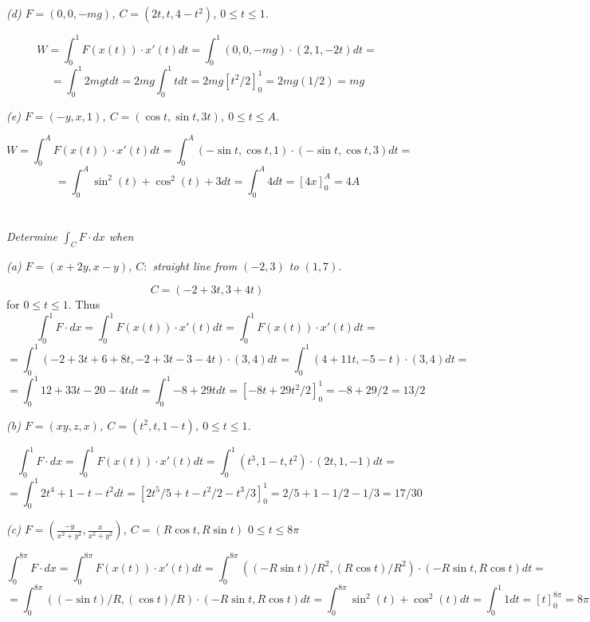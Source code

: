 \documentclass[11pt,oneside,titlepage]{book}
\begin{document}
\textit{(d) $F = (0, 0, -mg)$, $C = (2t, t, 4 - t^2)$, $0 \leq t \leq 1$.}

$$W = \int_0^1{F(x(t)) \cdot x'(t) dt} =
\int_0^1{(0, 0, -mg) \cdot (2, 1, -2t) dt} =$$
$$ =
\int_0^1{2mgt dt} = 2mg \int_0^1{t dt} = 2mg [t^2/2]_0^1 = 2mg(1/2) = mg$$

\textit{(e) $F = (-y, x, 1)$, $C = (\cos t, \sin t, 3 t)$, $0 \leq t \leq A$.}

$$W = \int_0^A{F(x(t)) \cdot x'(t) dt} =
\int_0^A{(- \sin t, \cos t, 1) \cdot (- \sin t, \cos t, 3) dt} = $$
$$ =
\int_0^A{\sin^2(t) + \cos^2(t) + 3 dt} =
\int_0^A{4 dt} = [4x]_0^A = 4A
$$

\section{}

\textit{Determine $\int_C{F \cdot dx}$ when}

\textit{(a) $F = (x + 2y, x - y)$, $C: $ straight line from $(-2, 3)$ to $(1, 7)$.}

$$C = (-2 + 3t, 3 + 4t) $$
for $0 \leq t \leq 1$. Thus
$$\int_0^1{F \cdot dx} = \int_0^1{F(x(t)) \cdot x'(t) dt} =
\int_0^1{F(x(t)) \cdot x'(t) dt} = $$
$$ = \int_0^1{(-2 + 3t + 6 + 8t, -2 + 3t - 3 - 4t) \cdot (3, 4) dt} =
\int_0^1{(4 + 11t, -5 - t) \cdot (3, 4) dt} = 
$$
$$
=  \int_0^1{12 + 33t - 20  - 4t dt} =  \int_0^1{- 8 + 29tdt} = [-8t + 29t^2/2]_0^1 = -8 + 29/2 =
13/2
$$

\textit{(b) $F = (xy, z, x)$, $C = (t^2, t, 1 - t)$, $0 \leq t \leq 1$.}

$$\int_0^1{F \cdot dx } = \int_0^1{F(x(t)) \cdot x'(t) dt } =
\int_0^1{(t^3, 1 - t, t^2) \cdot (2t, 1, -1) dt } = $$
$$ =
\int_0^1{2t^4 + 1 - t - t^2dt } = [2t^5/5 + t - t^2/2 - t^3/3]_0^1 = 2/5 + 1 - 1/2 - 1/3 = 17/30
$$

\textit{(c) $F = (\frac{-y}{x^2 + y^2}, \frac{x}{x^2 + y^2})$, $C = (R \cos t, R \sin t)$
  $0 \leq t \leq 8\pi$}

$$\int_0^{8 \pi}{F \cdot dx } = \int_0^{8 \pi}{F(x(t)) \cdot x'(t) dt } =
\int_0^{8 \pi}{((-R \sin t)/R^2, (R \cos t)/R^2) \cdot (-R \sin t, R \cos t) dt } = 
$$
$$ =
\int_0^{8 \pi}{((- \sin t)/R, ( \cos t)/R) \cdot (-R \sin t, R \cos t) dt } =
\int_0^{8 \pi}{\sin^2(t) + \cos^2(t) dt} = \int_0^1{1 dt} = [t]_0^{8\pi} = 8 \pi
$$

\section{}
\end{document}
